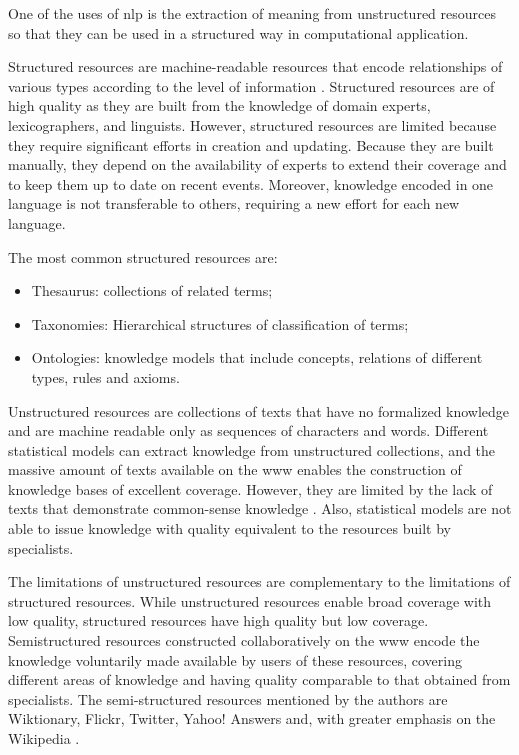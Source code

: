 One of the uses of \gls{nlp} is the extraction of meaning from unstructured resources so that they can be used in a structured way in computational application.

Structured resources are machine-readable resources that encode relationships of various types according to the level of information \cite{hovy2013collaboratively}. Structured resources are of high quality as they are built from the knowledge of domain experts, lexicographers, and linguists. However, structured resources are limited because they require significant efforts in creation and updating. Because they are built manually, they depend on the availability of experts to extend their coverage and to keep them up to date on recent events. Moreover, knowledge encoded in one language is not transferable to others, requiring a new effort for each new language.

The most common structured resources are:

\begin{itemize}

\item Thesaurus: collections of related terms;
\item Taxonomies: Hierarchical structures of classification of terms;
\item Ontologies: knowledge models that include concepts, relations of different types, rules and axioms.
\end{itemize}

Unstructured resources are collections of texts that have no formalized knowledge and are machine readable only as sequences of characters and words. Different statistical models can extract knowledge from unstructured collections, and the massive amount of texts available on the \gls{www} enables the construction of knowledge bases of excellent coverage. However, they are limited by the lack of texts that demonstrate common-sense knowledge \cite{hovy2013collaboratively}. Also, statistical models are not able to issue knowledge with quality equivalent to the resources built by specialists.

The limitations of unstructured resources are complementary to the limitations of structured resources. While unstructured resources enable broad coverage with low quality, structured resources have high quality but low coverage. Semistructured resources constructed collaboratively on the \gls{www} encode the knowledge voluntarily made available by users of these resources, covering different areas of knowledge and having quality comparable to that obtained from specialists. The semi-structured resources mentioned by the authors are Wiktionary, Flickr, Twitter, Yahoo! Answers and, with greater emphasis on the Wikipedia \cite{hovy2013collaboratively}.

